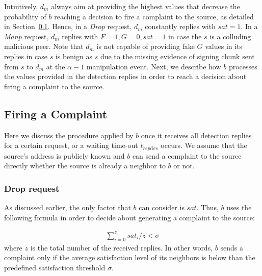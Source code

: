 Intuitively, $d_m$ always aim at providing the highest values that decrease the probability of $b$ reaching a decision to fire a complaint to the source, as detailed in Section~\ref{Firing_a_Complain}.
Hence, in a \textit{Drop} request, $d_m$ constantly replies with $sat=1$.
In a \textit{Manp} request, $d_m$ replies with $F=1, G=0, sat=1$ in case the $s$ is a colluding malicious peer.
Note that $d_m$ is not capable of providing fake $G$ values in its replies in case $s$ is benign as $s$ due to the missing evidence of signing chunk sent from $s$ to $d_m$ at the $\alpha-1$ manipulation event. 
Next, we describe how $b$ processes the values provided in the detection replies in order to reach a decision about firing a complaint to the source.

\subsection{Firing a Complaint}
\label{Firing_a_Complain}
Here we discuss the procedure applied by $b$ once it receives all detection replies for a certain request, or a waiting time-out $t_{replies}$ occurs.
We assume that the source's address is publicly known and $b$ can send a complaint to the source directly whether the source is already a neighbor to $b$ or not.
\subsubsection*{Drop request}
As discussed earlier, the only factor that $b$ can consider is $sat$.
Thus, $b$ uses the following formula in order to decide about generating a complaint to the source:

\begin{align}
\label{eq:drop_satis_equation}
\sum_{i=0}^{z} sat_i/z < \sigma
\end{align}
where $z$ is the total number of the received replies. 
In other words, $b$ sends a complaint only if the average satisfaction level of its neighbors is below than the predefined satisfaction threshold $\sigma$.

